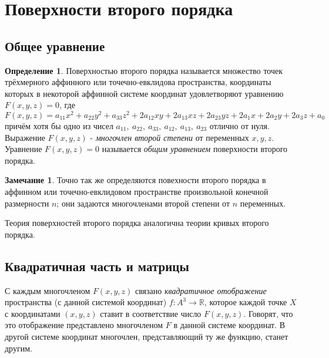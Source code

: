 \documentclass[a4paper, 12pt]{article}
\theoremstyle{definition}
\newtheorem*{definition}{Определение}
\newtheorem*{remark}{Замечание}
\begin{document}
\section{Поверхности второго порядка}


\subsection{Общее уравнение}
\begin{definition}
    Поверхностью второго порядка называется множество точек трёхмерного аффинного или точечно-евклидова пространства, координаты которых в некоторой аффинной системе координат удовлетворяют уравнению $F(x, y, z) = 0$, где
    \[ F(x, y, z) = a_{11} x^2 + a_{22} y^2 + a_{33} z^2 + 2a_{12} xy + 2a_{13} xz + 2a_{23} yz + 2a_1 x + 2a_2 y + 2a_3 z + a_0 \]
    причём хотя бы одно из чисел $a_{11}, \ a_{22}, \ a_{33}, \ a_{12}, \ a_{13}, \ a_{23}$ отлично от нуля. Выражение $F(x, y, z)$ - \textit{многочлен второй степени} от переменных $x, y, z$.
    Уравнение $F(x, y, z) = 0$ называется \textit{общим уравнением} поверхности второго порядка.
\end{definition}

\begin{remark}
    Точно так же определяются повехности второго порядка в аффинном или точечно-евклидовом пространстве произвольной конечной размерности $n$;
    они задаются многочленами второй степени от $n$ переменных.
\end{remark}

Теория поверхностей второго порядка аналогична теории кривых второго порядка.


\subsection{Квадратичная часть и матрицы}
С каждым многочленом $F(x,y,z)$ связано \textit{квадратичное отображение} пространства (с данной системой координат) $f: A^3 \to \mathbb{R}$, которое каждой точке $X$ с координатами $(x, y, z)$ ставит в соответствие число $F(x,y,z)$.
Говорят, что это отображение представлено многочленом $F$ в данной системе координат.
В другой системе координат многочлен, представляющий ту же функцию, станет другим.
\end{document}
